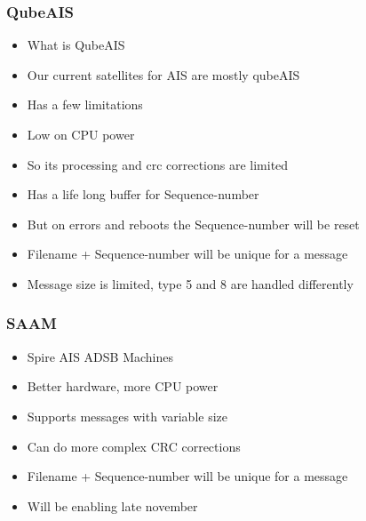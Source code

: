 \documentclass[12pt]{beamer}
\begin{document}
    \begin{frame}
        \frametitle{QubeAIS}
            \begin{itemize}
                \item What is QubeAIS
                \pause
                \item Our current satellites for AIS are mostly qubeAIS
                \pause
                \item Has a few limitations
                \pause
                \item Low on CPU power
                \pause
                \item So its processing and crc corrections are limited
                \pause
                \item Has a life long buffer for Sequence-number
                \pause
                \item But on errors and reboots the Sequence-number will be reset
                \pause
                \item Filename + Sequence-number will be unique for a message
                \pause
                \item Message size is limited, type 5 and 8 are handled differently
            \end{itemize}
    \end{frame}

    \begin{frame}
        \frametitle{SAAM}
            \begin{itemize}
                \item Spire AIS ADSB Machines
                \pause
                \item Better hardware, more CPU power
                \pause
                \item Supports messages with variable size
                \pause
                \item Can do more complex CRC corrections
                \pause
                \item Filename + Sequence-number will be unique for a message
                \pause
                \item Will be enabling late november
            \end{itemize}
    \end{frame}
\end{document}
